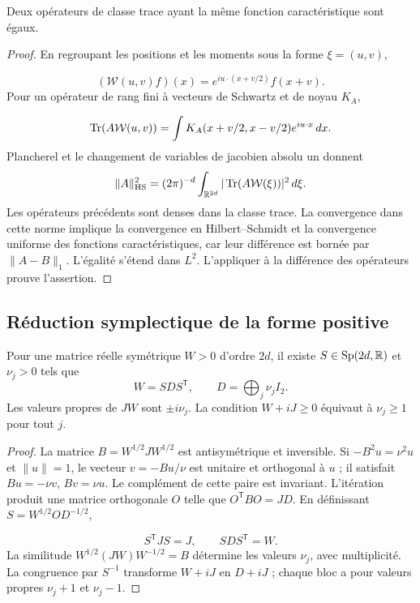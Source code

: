 \begin{lemma}
\label{app:lem:unicidad-weyl}
Deux opérateurs de classe trace ayant la même fonction caractéristique sont égaux.
\end{lemma}
\begin{proof}
En regroupant les positions et les moments sous la forme \(\xi=(u,v)\),

\[
 (\mathcal W(u,v)f)(x)=e^{iu\cdot(x+v/2)}f(x+v).
\]
Pour un opérateur de rang fini à vecteurs de Schwartz et de noyau \(K_A\),

\[
 \operatorname{Tr}(A\mathcal W(u,v))=\int K_A(x+v/2,x-v/2)e^{iu\cdot x}\,dx.
\]
Plancherel et le changement de variables de jacobien absolu un donnent
\[
 \|A\|_{\rm HS}^2=(2\pi)^{-d}\int_{\mathbb R^{2d}}
 |\operatorname{Tr}(A\mathcal W(\xi))|^2\,d\xi.
\]
Les opérateurs précédents sont denses dans la classe trace. La convergence
dans cette norme implique la convergence en Hilbert--Schmidt et la convergence
uniforme des fonctions caractéristiques, car leur différence est
bornée par \(\|A-B\|_1\). L’égalité s’étend dans \(L^2\).
L’appliquer à la différence des opérateurs prouve l’assertion.
\end{proof}

\subsection{Réduction symplectique de la forme positive
}
\begin{theorem}
\label{app:thm:williamson}
Pour une matrice réelle symétrique \(W>0\) d’ordre \(2d\), il existe
\(S\in\operatorname{Sp}(2d,\mathbb R)\) et \(\nu_j>0\) tels que
\[
 W=SDS^{\mathsf T},\qquad D=\bigoplus_j\nu_jI_2.
\]
Les valeurs propres de \(JW\) sont \(\pm i\nu_j\). La condition
\(W+iJ\geq0\) équivaut à \(\nu_j\geq1\) pour tout \(j\).

\end{theorem}
\begin{proof}
La matrice \(B=W^{1/2}JW^{1/2}\) est antisymétrique et inversible.
Si \(-B^2u=\nu^2u\) et \(\|u\|=1\), le vecteur
\(v=-Bu/\nu\) est unitaire et orthogonal à \(u\) ; il satisfait
\(Bu=-\nu v\), \(Bv=\nu u\). Le complément de cette paire est
invariant. L’itération produit une matrice orthogonale \(O\) telle que
\(O^{\mathsf T}BO=JD\). En définissant \(S=W^{1/2}OD^{-1/2}\),

\[
 S^{\mathsf T}JS=J,\qquad SDS^{\mathsf T}=W.
\]
La similitude \(W^{1/2}(JW)W^{-1/2}=B\) détermine les valeurs
\(\nu_j\), avec multiplicité. La congruence par \(S^{-1}\)
transforme \(W+iJ\) en \(D+iJ\) ; chaque bloc a pour valeurs propres
\(\nu_j+1\) et \(\nu_j-1\).
\end{proof}

